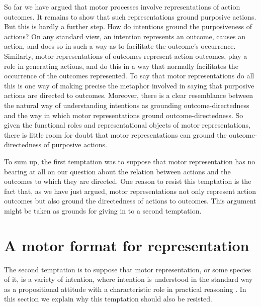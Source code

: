 \documentclass[12pt,\papersize]{extarticle}
\begin{document}
So far we have argued that motor processes involve representations of action outcomes. It remains to show that such representations ground purposive actions. But this is hardly a further step. How do intentions ground the purposiveness of actions?  On any standard view, an intention represents an outcome, causes an action, and does so in such a way as to facilitate the outcome's occurrence. Similarly, motor representations of outcomes represent action outcomes, play a role in generating actions, and do this in a way that normally facilitates the occurrence of the outcomes represented. To say that motor representations do all this is one way of making precise the metaphor involved in saying that purposive actions are directed to outcomes.  Moreover, there is a clear resemblance between the natural way of understanding intentions as grounding outcome-directedness and the way in which motor representations ground outcome-directedness.  So given the functional roles and representational objects of motor representations, there is little room for doubt that motor representations can ground the outcome-directedness of purposive actions.

To sum up, the first temptation was to suppose that motor representation has no bearing at all on our question about the relation between actions and the outcomes to which they are directed. One reason to resist this temptation is the fact that, as we have just argued, motor representations not only represent action outcomes but also ground the directedness of actions to outcomes.  This argument might be taken as grounds for giving in to a second temptation.



\section{A motor format for representation}
The second temptation is to suppose that motor representation, or some species of it, is a variety of intention, where intention is understood in the standard way as a propositional attitude with a characteristic role in practical reasoning \citep{Bratman:1987xw}. In this section we explain why this temptation should also be resisted.
\end{document}
